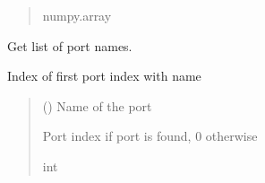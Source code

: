 \documentclass[letterpaper,10pt,english]{sphinxmanual}
\begin{document}
\begin{fulllineitems}
\begin{fulllineitems}
\begin{quote}
\begin{description}
\sphinxAtStartPar
numpy.array

\end{description}\end{quote}

\end{fulllineitems}


\begin{fulllineitems}
\label{\detokenize{touchstone:touchstone.spfile.get_no_of_ports}}
\pysigstartsignatures
{}
\pysigstopsignatures
\end{fulllineitems}


\begin{fulllineitems}
\label{\detokenize{touchstone:touchstone.spfile.get_port_names}}
\pysigstartsignatures
{}
\pysigstopsignatures
\sphinxAtStartPar
Get list of port names.

\end{fulllineitems}


\begin{fulllineitems}
\label{\detokenize{touchstone:touchstone.spfile.get_port_number_from_name}}
\pysigstartsignatures
{}
\pysigstopsignatures
\sphinxAtStartPar
Index of first port index with name 
\begin{quote}\begin{description}
\sphinxAtStartPar
{} () \textendash{} Name of the port

\sphinxAtStartPar
Port index if port is found, 0 otherwise

\sphinxAtStartPar
int


\end{description}
\end{quote}
\end{fulllineitems}
\end{fulllineitems}
\end{document}

